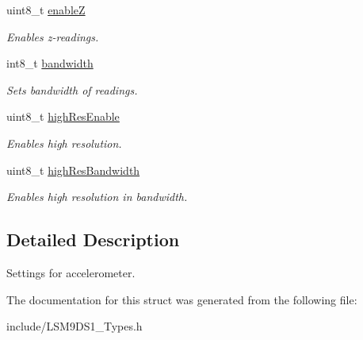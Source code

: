 \begin{DoxyCompactItemize}
\mbox{\label{structaccelSettings_abdb5ee5fb9a802315d8340ea5d83b587}} 
uint8\+\_\+t \hyperlink{structaccelSettings_abdb5ee5fb9a802315d8340ea5d83b587}{enableZ}
\begin{DoxyCompactList}\small\item\em Enables z-\/readings. \end{DoxyCompactList}\item 
\mbox{\label{structaccelSettings_ab64c80f62ecfeb3041744febaed9407b}} 
int8\+\_\+t \hyperlink{structaccelSettings_ab64c80f62ecfeb3041744febaed9407b}{bandwidth}
\begin{DoxyCompactList}\small\item\em Sets bandwidth of readings. \end{DoxyCompactList}\item 
\mbox{\label{structaccelSettings_ad165444ae7996ff6160be01d77d33b62}} 
uint8\+\_\+t \hyperlink{structaccelSettings_ad165444ae7996ff6160be01d77d33b62}{high\+Res\+Enable}
\begin{DoxyCompactList}\small\item\em Enables high resolution. \end{DoxyCompactList}\item 
\mbox{\label{structaccelSettings_a3925a8342b5a4b3caecd187e729954f3}} 
uint8\+\_\+t \hyperlink{structaccelSettings_a3925a8342b5a4b3caecd187e729954f3}{high\+Res\+Bandwidth}
\begin{DoxyCompactList}\small\item\em Enables high resolution in bandwidth. \end{DoxyCompactList}\end{DoxyCompactItemize}


\subsection{Detailed Description}
Settings for accelerometer. 

The documentation for this struct was generated from the following file\+:\begin{DoxyCompactItemize}
\item 
include/L\+S\+M9\+D\+S1\+\_\+\+Types.\+h\end{DoxyCompactItemize}
